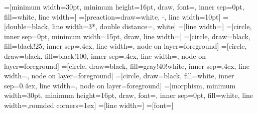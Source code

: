 
\makeatletter
{}
\def\node@on@layer{\aftergroup\node@@on@layer}
\makeatother\def\thickness{0.7pt}
=[minimum width=30pt, minimum height=16pt, draw, font=\small, inner sep=0pt, fill=white, line width=\thickness]
=[preaction={draw=white, -, line width=10pt}]
=[double=black, line width=3*\thickness, double distance=\thickness, white]
=[line width=\thickness]
=[circle, inner sep=0pt, minimum width=15pt, draw, line width=\thickness]
=[circle, draw=black, fill=black!25, inner sep=.4ex, line width=\thickness, node on layer=foreground]
=[circle, draw=black, fill=black!100, inner sep=.4ex, line width=\thickness, node on layer=foreground]
=[circle, draw=black, fill=gray!40!white, inner sep=.4ex, line width=\thickness, node on layer=foreground]
=[circle, draw=black, fill=white, inner sep=0.4ex, line width=\thickness, node on layer=foreground]
=[morphism, minimum width=30pt, minimum height=16pt, draw, font=\small, inner sep=0pt, fill=white, line width=\thickness,rounded corners=1ex]
=[line width=\thickness]
=[font=\tiny]


